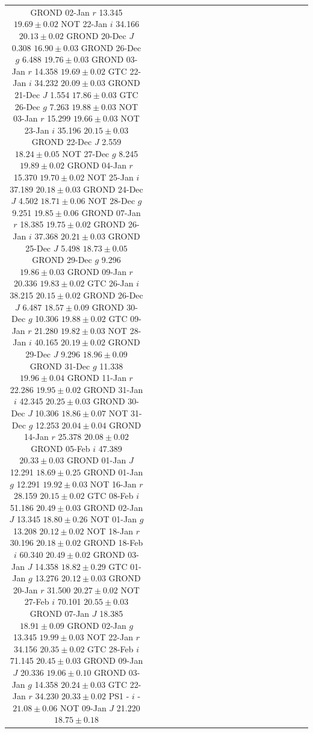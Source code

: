 \documentclass[traditabstract,longauth]{aa}
\begin{document}
\begin{appendix}
\begin{landscape}
\begin{table}
\begin{tabular}{ccccc|ccccc|ccccc|ccccc}
GROND		02-Jan		$r$		13.345		$	19.69	\pm	0.02	$		
NOT		22-Jan		$i$		34.166		$	20.13	\pm	0.02	$		
GROND		20-Dec		$J$		0.308		$	16.90	\pm	0.03	$	
GROND		26-Dec		$g$		6.488		$	19.76	\pm	0.03	$		
GROND		03-Jan		$r$		14.358		$	19.69	\pm	0.02	$		
GTC		22-Jan		$i$		34.232		$	20.09	\pm	0.03	$		
GROND		21-Dec		$J$		1.554		$	17.86	\pm	0.03	$	
GTC		26-Dec		$g$		7.263		$	19.88	\pm	0.03	$		
NOT		03-Jan		$r$		15.299		$	19.66	\pm	0.03	$		
NOT		23-Jan		$i$		35.196		$	20.15	\pm	0.03	$		
GROND		22-Dec		$J$		2.559		$	18.24	\pm	0.05	$	
NOT		27-Dec		$g$		8.245		$	19.89	\pm	0.02	$		
GROND		04-Jan		$r$		15.370		$	19.70	\pm	0.02	$		
NOT		25-Jan		$i$		37.189		$	20.18	\pm	0.03	$		
GROND		24-Dec		$J$		4.502		$	18.71	\pm	0.06	$	
NOT		28-Dec		$g$		9.251		$	19.85	\pm	0.06	$		
GROND		07-Jan		$r$		18.385		$	19.75	\pm	0.02	$		
GROND		26-Jan		$i$		37.368		$	20.21	\pm	0.03	$		
GROND		25-Dec		$J$		5.498		$	18.73	\pm	0.05	$	
GROND		29-Dec		$g$		9.296		$	19.86	\pm	0.03	$		
GROND		09-Jan		$r$		20.336		$	19.83	\pm	0.02	$		
GTC		26-Jan		$i$		38.215		$	20.15	\pm	0.02	$		
GROND		26-Dec		$J$		6.487		$	18.57	\pm	0.09	$	
GROND		30-Dec		$g$		10.306		$	19.88	\pm	0.02	$		
GTC		09-Jan		$r$		21.280		$	19.82	\pm	0.03	$		
NOT		28-Jan		$i$		40.165		$	20.19	\pm	0.02	$		
GROND		29-Dec		$J$		9.296		$	18.96	\pm	0.09	$	
GROND		31-Dec		$g$		11.338		$	19.96	\pm	0.04	$		
GROND		11-Jan		$r$		22.286		$	19.95	\pm	0.02	$		
GROND		31-Jan		$i$		42.345		$	20.25	\pm	0.03	$		
GROND		30-Dec		$J$		10.306		$	18.86	\pm	0.07	$	
NOT		31-Dec		$g$		12.253		$	20.04	\pm	0.04	$		
GROND		14-Jan		$r$		25.378		$	20.08	\pm	0.02	$		
GROND		05-Feb		$i$		47.389		$	20.33	\pm	0.03	$		
GROND		01-Jan		$J$		12.291		$	18.69	\pm	0.25	$	
GROND		01-Jan		$g$		12.291		$	19.92	\pm	0.03	$		
NOT		16-Jan		$r$		28.159		$	20.15	\pm	0.02	$		
GTC		08-Feb		$i$		51.186		$	20.49	\pm	0.03	$		
GROND		02-Jan		$J$		13.345		$	18.80	\pm	0.26	$	
NOT		01-Jan		$g$		13.208		$	20.12	\pm	0.02	$		
NOT		18-Jan		$r$		30.196		$	20.18	\pm	0.02	$		
GROND		18-Feb		$i$		60.340		$	20.49	\pm	0.02	$		
GROND		03-Jan		$J$		14.358		$	18.82	\pm	0.29	$	
GTC		01-Jan		$g$		13.276		$	20.12	\pm	0.03	$		
GROND		20-Jan		$r$		31.500		$	20.27	\pm	0.02	$		
NOT		27-Feb		$i$		70.101		$	20.55	\pm	0.03	$		
GROND		07-Jan		$J$		18.385		$	18.91	\pm	0.09	$	
GROND		02-Jan		$g$		13.345		$	19.99	\pm	0.03	$		
NOT		22-Jan		$r$		34.156		$	20.35	\pm	0.02	$		
GTC		28-Feb		$i$		71.145		$	20.45	\pm	0.03	$		
GROND		09-Jan		$J$		20.336		$	19.06	\pm	0.10	$	
GROND		03-Jan		$g$		14.358		$	20.24	\pm	0.03	$		
GTC		22-Jan		$r$		34.230		$	20.33	\pm	0.02	$		
PS1		-		$i$		-		$	21.08	\pm	0.06	$		
NOT		09-Jan		$J$		21.220		$	18.75	\pm	0.18	$	

\end{tabular}
\end{table}
\end{landscape}
\end{appendix}
\end{document}
